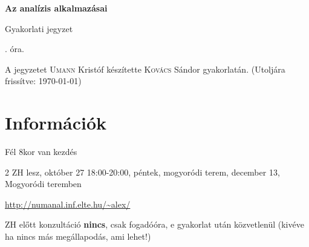 \documentclass[a4paper,11.5pt]{article}
\begin{document}
	\setlength\parindent{0pt}
	\def\a{\textbf{a}}
	\def\b{\textbf{b}}
	\def\N{\hskip 10 true mm}
	\def\a{\textbf{a}}
	\def\b{\textbf{b}}
	\def\c{\textbf{c}}
	\def\d{\textbf{d}}
	\def\e{\textbf{e}}
	\def\gg{$\gamma$}
	\def\vi{\textbf{i}}
	\def\jj{\textbf{j}}
	\def\kk{\textbf{k}}
	\def\fh{\overrightarrow}
	\def\l{\lambda}
	\def\m{\mu}
	\def\v{\textbf{v}}
	\def\0{\textbf{0}}
	\def\s{\hspace{0.2mm}\vphantom{\beta}}
	\def\Z{\mathbb{Z}}
	\def\Q{\mathbb{Q}}
	\def\R{\mathbb{R}}
	\def\C{\mathbb{C}}
	\def\N{\mathbb{N}}
	\def\Rn{\mathbb{R}^{n}}
	\def\Ra{\overline{\mathbb{R}}}
	\def\sume{\displaystyle\sum_{n=1}^{+\infty}}
	\def\sumn{\displaystyle\sum_{n=0}^{+\infty}}
	\def\biz{\emph{Bizonyítás:\ }}
	\def\narrow{\underset{n\rightarrow+\infty}{\longrightarrow}}
	\def\limn{\displaystyle\lim_{n\to +\infty}}
	
	\theoremstyle{definition}
	\newtheorem{theorem}{Tétel}[subsubsection]
	
	\theoremstyle{definition}
	\newtheorem{definition}[theorem]{Definíció}
	\newtheorem{example}[theorem]{Példa}
	\newtheorem{exercise}[theorem]{Házi feladat}
	\newtheorem{note}[theorem]{Megjegyzés}
	\newtheorem{task}[theorem]{Feladat}
	\newtheorem{revision}[theorem]{Emlékeztető}
	\begin{center}
		{\LARGE\textbf{Az analízis alkalmazásai}}
		\smallskip

		{\Large Gyakorlati jegyzet}

		. óra.
	\end{center}
	A jegyzetet \textsc{Umann} Kristóf készítette \textsc{Kovács} Sándor gyakorlatán. (Utoljára frissítve: \today)
	\section{Információk}
	\begin{compactitem}
		\item Fél 8kor van kezdés
		\item 2 ZH lesz, október 27 18:00-20:00, péntek, mogyoródi terem, december 13, Mogyoródi teremben
		\item \url{http://numanal.inf.elte.hu/~alex/}
		\item ZH előtt konzultáció \textbf{nincs}, csak fogadóóra, e gyakorlat után közvetlenül (kivéve ha nincs más megállapodás, ami lehet!)
	\end{compactitem}
\end{document}
